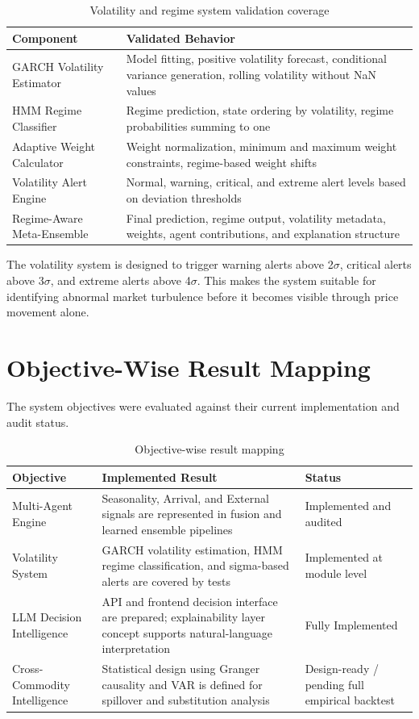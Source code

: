\documentclass[12pt,a4paper]{report}
\begin{document}
\begin{table}[H]
\centering
\caption{Volatility and regime system validation coverage}
\label{tab:volatility_regime_coverage}
\begin{tabular}{|p{5.5cm}|p{7cm}|}
\hline
\textbf{Component} & \textbf{Validated Behavior} \\
\hline
GARCH Volatility Estimator & Model fitting, positive volatility forecast, conditional variance generation, rolling volatility without NaN values \\
\hline
HMM Regime Classifier & Regime prediction, state ordering by volatility, regime probabilities summing to one \\
\hline
Adaptive Weight Calculator & Weight normalization, minimum and maximum weight constraints, regime-based weight shifts \\
\hline
Volatility Alert Engine & Normal, warning, critical, and extreme alert levels based on deviation thresholds \\
\hline
Regime-Aware Meta-Ensemble & Final prediction, regime output, volatility metadata, weights, agent contributions, and explanation structure \\
\hline
\end{tabular}
\end{table}

The volatility system is designed to trigger warning alerts above 2$\sigma$, critical alerts above 3$\sigma$, and extreme alerts above 4$\sigma$. This makes the system suitable for identifying abnormal market turbulence before it becomes visible through price movement alone.

\section{Objective-Wise Result Mapping}

The system objectives were evaluated against their current implementation and audit status.

\begin{table}[H]
\centering
\caption{Objective-wise result mapping}
\label{tab:objective_mapping}
\begin{tabular}{|p{4cm}|p{5cm}|p{4cm}|}
\hline
\textbf{Objective} & \textbf{Implemented Result} & \textbf{Status} \\
\hline
Multi-Agent Engine & Seasonality, Arrival, and External signals are represented in fusion and learned ensemble pipelines & Implemented and audited \\
\hline
Volatility System & GARCH volatility estimation, HMM regime classification, and sigma-based alerts are covered by tests & Implemented at module level \\
\hline
LLM Decision Intelligence & API and frontend decision interface are prepared; explainability layer concept supports natural-language interpretation & Fully Implemented \\
\hline
Cross-Commodity Intelligence & Statistical design using Granger causality and VAR is defined for spillover and substitution analysis & Design-ready / pending full empirical backtest \\
\hline
\end{tabular}
\end{table}
\end{document}
